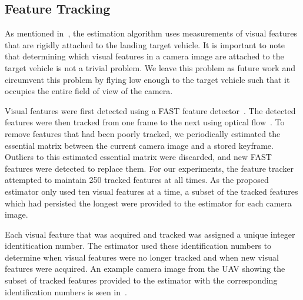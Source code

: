 
\subsection{Feature Tracking}
As mentioned in~,
the estimation algorithm uses measurements of visual features that are
rigidly attached to the landing target vehicle. It is important to note that
determining which visual features in a camera image are attached to
the target vehicle is not a trivial problem. We leave this problem as future work and
circumvent this problem by flying low enough to the target vehicle such that it
occupies the entire field of view of the camera.

Visual features were first detected using a FAST feature
detector~\cite{rosten2006machine}. The detected features were then tracked from one frame to
the next using optical flow~\cite{bouguet2001pyramidal}.
To remove features that had been poorly tracked, we periodically
estimated the essential matrix between the current camera image
and a stored keyframe.
Outliers to this estimated essential matrix were discarded, and new FAST
features were detected to replace them.
For our experiments, the feature tracker attempted to maintain 250
tracked features at all times. As the proposed estimator only used ten visual
features at a time,
a subset of the tracked features which had persisted the longest
were provided to the estimator for each camera image.

Each visual feature that was acquired and tracked was assigned a unique integer
identitication number. The estimator used these identification numbers to
determine when visual features were no longer tracked and when new visual
features were acquired.
An example camera image from the UAV showing the
subset of tracked features provided to the estimator with the corresponding
identification
numbers is seen in~.


